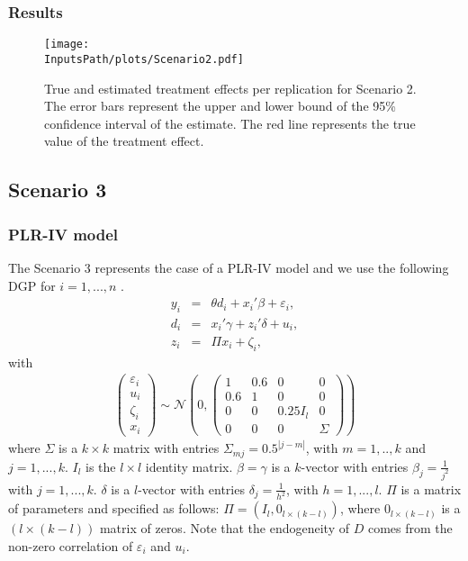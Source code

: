 \documentclass[10pt]{article}
\newcommand*{\InputsFolderPath}{C:/DEV/DML/src/data/}
\newcommand*{\InputsPath}{\InputsFolderPath/20221103}
\begin{document}
\subsubsection{Results}
\begin{figure}[H]
	\begin{center}
		\texttt{[image: \\InputsPath/plots/Scenario2.pdf]}
		\caption{True and estimated treatment effects per replication for Scenario 2. The error bars represent the upper and lower bound of the 95\% confidence interval of the estimate. The red line represents the true value of the treatment effect.}
		\label{Scenario2}
	\end{center}
\end{figure}



\subsection{Scenario 3}
\subsubsection{PLR-IV model}
The Scenario 3 represents the case of a PLR-IV model and we use the following DGP for $i=1,...,n$ \cite{Cher2015}.
\begin{eqnarray*}\label{dgp_2.1}
y_i &=& \theta d_i + x_i' \beta + \varepsilon_i,	\\
d_i &=& x_i' \gamma + z_i' \delta + u_i, \\
z_i &=& \Pi x_i + \zeta_i, 
\end{eqnarray*}
with
\begin{eqnarray*}\label{dgp_2.2}
	\left(\begin{matrix} \varepsilon_i \\ u_i \\ \zeta_i \\ x_i \end{matrix} \right) \sim
\mathcal{N}\left(0, \left(\begin{matrix} 1 & 0.6 & 0 & 0 \\ 0.6 & 1 & 0 & 0 \\
	0 & 0 & 0.25 I_{l} & 0 \\ 0 & 0 & 0 & \Sigma \end{matrix} \right) \right)
\end{eqnarray*}
where  $\Sigma$ is a $k \times k$ matrix with entries
$\Sigma_{mj} = 0.5^{|j-m|}$, with $m=1,..,k$ and $j=1,...,k$. 
$I_{l}$ is the $l \times l$ identity matrix.
$\beta = \gamma$ is a $k$-vector with entries $\beta_j=\frac{1}{j^2}$ with  $j=1,...,k$.
$\delta$ is a $l$-vector with entries $\delta_j=\frac{1}{h^2}$, with $h=1,...,l$.
$\Pi$ is a matrix of parameters and specified as follows: $\Pi = (I_{l}, 0_{l \times (k - l)})$, where $ 0_{l \times (k - l)}$ is a $(l \times (k-l))$ matrix of zeros.
Note that the endogeneity of $D$ comes from the non-zero correlation of $\varepsilon_i$ and $u_i$.
\end{document}
